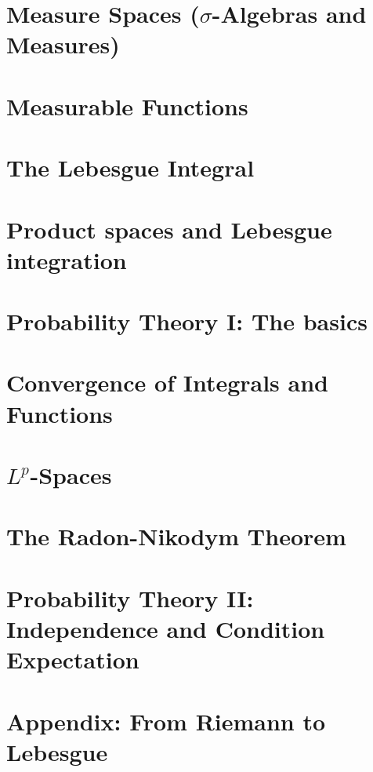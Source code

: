 \documentclass{lecturenotes}
\begin{document}
\chapter{Measure Spaces ($\sigma$-Algebras and Measures)}
\label{chapter:sigma_algebras}


\chapter{Measurable Functions}
\label{chapter:measurable_functions}


\chapter{The Lebesgue Integral}
\label{chapter:integration}


\chapter{Product spaces and Lebesgue integration}
\label{chapter:fubini-tonelli}


\chapter{Probability Theory I: The basics}
\label{chapter:probability_1}


\chapter{Convergence of Integrals and Functions}
\label{chapter:convergence}


\chapter{$L^p$-Spaces}
\label{chapter:lp_spaces}




\chapter{The Radon-Nikodym Theorem}
\label{chapter:radon-nikodym}


\chapter{Probability Theory II: Independence and Condition Expectation}
\label{chapter:probability_2}

%
\chapter{Appendix: From Riemann to Lebesgue}
\label{chapter:appendix-2}


%
\end{document}
